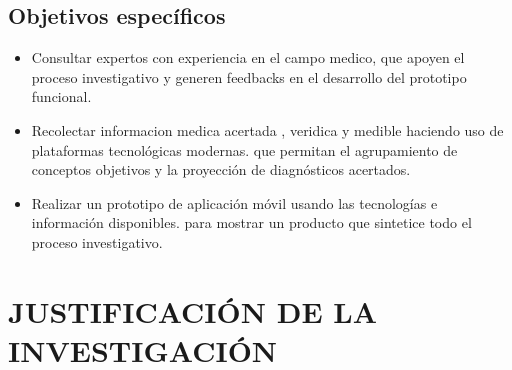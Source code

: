 \documentclass[a4paper,man,natbib]{apa6}
\begin{document}
\subsection{Objetivos específicos}
\begin{itemize}
\item  Consultar expertos con experiencia en el campo medico, que apoyen el proceso investigativo y generen feedbacks en el desarrollo del prototipo funcional. 
\item Recolectar informacion medica acertada , veridica y medible haciendo  uso de plataformas tecnológicas modernas. 
que permitan el agrupamiento de conceptos objetivos y la proyección de diagnósticos acertados.
\item  Realizar un prototipo de aplicación móvil usando las tecnologías e información disponibles. 
para mostrar un producto que sintetice todo el proceso investigativo.
\end{itemize}

\section{JUSTIFICACIÓN DE LA INVESTIGACIÓN}
\end{document}

